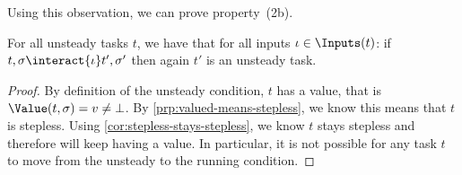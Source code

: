 Using this observation, we can prove property~(2b).
\begin{proposition}
  For all unsteady tasks $t$,
  we have that for all inputs $\iota \in \Inputs(t)$:
    if $t,\sigma \interact{\iota} t',\sigma'$
    then again $t'$ is an unsteady task.
\end{proposition}
\begin{proof}
  By definition of the unsteady condition, $t$ has a value,
  that is $\Value(t,\sigma) = v \neq \bot$.
  By \cref{prp:valued-means-stepless}, we know this means that $t$ is stepless.
  Using \cref{cor:stepless-stays-stepless}, we know $t$ stays stepless
  and therefore will keep having a value.
  In particular, it is not possible for any task $t$ to move from the unsteady to the running condition.
\end{proof}
